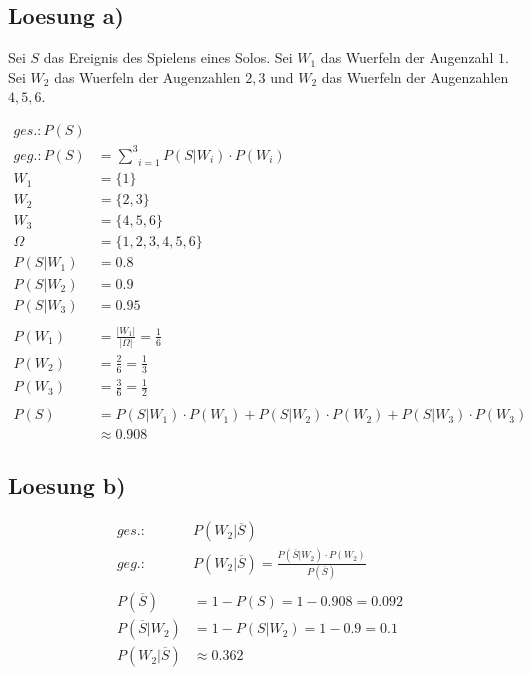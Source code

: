 \documentclass[]{article}
\begin{document}
\subsection{Loesung a)}

Sei $S$ das Ereignis des Spielens eines Solos. Sei $W_1$ das Wuerfeln der Augenzahl $1$. Sei $W_2$ das Wuerfeln der Augenzahlen $2, 3$ und $W_2$ das Wuerfeln der Augenzahlen $4, 5, 6$. 

\begin{equation}
	\begin{split}
		ges.: P(S) & \\
		geg.: P(S) &= \underset{i=1}{\overset{3}{\mathrm{\sum}}} P(S \vert W_i) \cdot P(W_i)\\
		W_1 &= \{1\} \\
		W_2 &= \{2, 3\} \\
		W_3 &= \{4, 5, 6\} \\
		\Omega &= \{1, 2, 3, 4, 5, 6\} \\
		P(S \vert W_1) &= 0.8 \\
		P(S \vert W_2) &= 0.9 \\
		P(S \vert W_3) &= 0.95 \\
		& \\
		P(W_1) &= \frac{\vert W_1 \vert}{\vert \Omega \vert} = \frac{1}{6} \\
		P(W_2) &= \frac{2}{6} = \frac{1}{3} \\
		P(W_3) &= \frac{3}{6} = \frac{1}{2} \\
		& \\
		P(S) &= P(S \vert W_1) \cdot P(W_1) + P(S \vert W_2) \cdot P(W_2) + P(S \vert W_3) \cdot P(W_3) \\
		&\approx 0.908
	\end{split}
\end{equation}

\subsection{Loesung b)}

\begin{equation}
	\begin{split}
		ges.: & P(W_2 \vert \overline{S}) \\
		geg.: & P(W_2 \vert \overline{S}) = \frac{P(\overline{S} \vert W_2) \cdot P(W_2)}{P(\overline{S})} \\
		& \\
		P(\overline{S}) &= 1 - P(S) = 1 - 0.908 = 0.092 \\
		P(\overline{S} \vert W_2) &= 1 - P(S \vert W_2) = 1 - 0.9 = 0.1 \\
		P(W_2 \vert \overline{S}) &\approx 0.362
	\end{split}
\end{equation}
\end{document}
